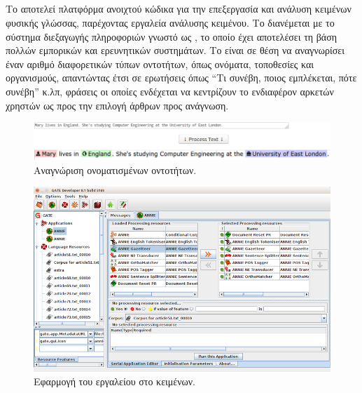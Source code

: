 {{\subsection{}

Το {} \cite{Gt01} αποτελεί πλατφόρμα ανοιχτού κώδικα για την επεξεργασία και ανάλυση κειμένων φυσικής γλώσσας, 
παρέχοντας εργαλεία ανάλυσης κειμένου. Το {} διανέμεται με το σύστημα διεξαγωγής πληροφοριών γνωστό ως {}, 
το οποίο έχει αποτελέσει τη βάση πολλών εμπορικών και ερευνητικών συστημάτων.
Το {} είναι σε θέση να αναγνωρίσει έναν αριθμό διαφορετικών τύπων οντοτήτων, όπως ονόματα, τοποθεσίες και οργανισμούς, 
απαντώντας έτσι σε ερωτήσεις όπως “Τι συνέβη, ποιος εμπλέκεται, πότε συνέβη” κ.λπ, φράσεις οι οποίες 
ενδέχεται να κεντρίζουν το ενδιαφέρον αρκετών χρηστών ως προς την επιλογή άρθρων προς ανάγνωση. \\

\begin{figure}[!ht] \centering
\centerline{
    \includegraphics[scale=0.5]{static/figures/gate.png}}
    \caption{Αναγνώριση ονοματισμένων οντοτήτων.}
    \label{}
\end{figure}

\newpage

\begin{figure}[!ht] \centering
\centerline{
    \includegraphics[scale=0.5]{static/figures/gate1.png}}
    \caption{Εφαρμογή του εργαλείου {} στο {} κειμένων.}
    \label{}
\end{figure}

}}
